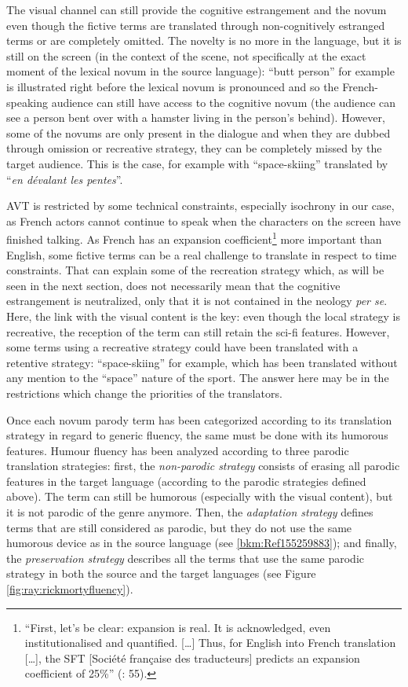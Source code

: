 \documentclass[output=paper]{langscibook}
\begin{document}
The visual channel can still provide the cognitive estrangement and the novum even though the fictive terms are translated through non-cognitively estranged terms or are completely omitted. The novelty is no more in the language, but it is still on the screen (in the context of the scene, not specifically at the exact moment of the lexical novum in the source language): “butt person” for example is illustrated right before the lexical novum is pronounced and so the French-speaking audience can still have access to the cognitive novum (the audience can see a person bent over with a hamster living in the person's behind). However, some of the novums are only present in the dialogue and when they are dubbed through omission or recreative strategy, they can be completely missed by the target audience. This is the case, for example with “space-skiing” translated by “\textit{en dévalant les pentes}”.

AVT is restricted by some technical constraints, especially isochrony in our case, as French actors cannot continue to speak when the characters on the screen have finished talking. As French has an expansion coefficient\footnote{“First, let’s be clear: expansion is real. It is acknowledged, even institutionalised and quantified. […] Thus, for English into French translation […], the SFT [Société française des traducteurs] predicts an expansion coefficient of 25\%” (\citealt{Durieux1990}: 55).} more important than English, some fictive terms can be a real challenge to translate in respect to time constraints. That can explain some of the recreation strategy which, as will be seen in the next section, does not necessarily mean that the cognitive estrangement is neutralized, only that it is not contained in the neology \textit{per se}. Here, the link with the visual content is the key: even though the local strategy is recreative, the reception of the term can still retain the sci-fi features. However, some terms using a recreative strategy could have been translated with a retentive strategy: “space-skiing” for example, which has been translated without any mention to the “space” nature of the sport. The answer here may be in the restrictions which change the priorities of the translators.

Once each novum parody term has been categorized according to its translation strategy in regard to generic fluency, the same must be done with its humorous features. Humour fluency has been analyzed according to three parodic translation strategies: first, the \textit{non-parodic strategy} consists of erasing all parodic features in the target language (according to the parodic strategies defined above). The term can still be humorous (especially with the visual content), but it is not parodic of the genre anymore. Then, the \textit{adaptation strategy} defines terms that are still considered as parodic, but they do not use the same humorous device as in the source language (see \ref{bkm:Ref155259883}); and finally, the \textit{preservation strategy} describes all the terms that use the same parodic strategy in both the source and the target languages (see Figure \ref{fig:ray:rickmortyfluency}).
\end{document}
